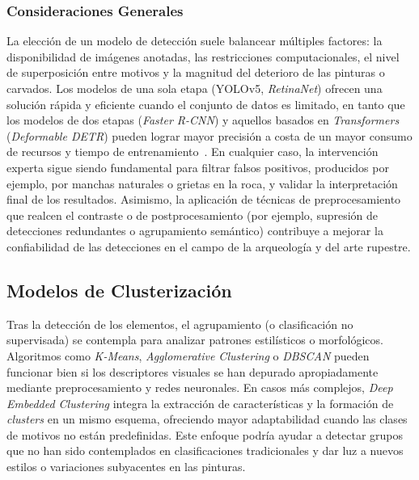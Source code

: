 \subsubsection*{Consideraciones Generales}

La elección de un modelo de detección suele balancear múltiples factores: la disponibilidad de imágenes anotadas, las restricciones computacionales, el nivel de superposición entre motivos y la magnitud del deterioro de las pinturas o carvados.
Los modelos de una sola etapa (YOLOv5, \textit{RetinaNet}) ofrecen una solución rápida y eficiente cuando el conjunto de datos es limitado, en tanto que los modelos de dos etapas (\textit{Faster R-CNN}) y aquellos basados en \textit{Transformers} (\textit{Deformable DETR}) pueden lograr mayor precisión a costa de un mayor consumo de recursos y tiempo de entrenamiento~\cite{horn2022,davis2021,jalandoni2022,li2022,tsigkas2020}.
En cualquier caso, la intervención experta sigue siendo fundamental para filtrar falsos positivos, producidos por ejemplo, por manchas naturales o grietas en la roca, y validar la interpretación final de los resultados.
Asimismo, la aplicación de técnicas de preprocesamiento que realcen el contraste o de postprocesamiento (por ejemplo, supresión de detecciones redundantes o agrupamiento semántico) contribuye a mejorar la confiabilidad de las detecciones en el campo de la arqueología y del arte rupestre.

\subsection{Modelos de Clusterización}

Tras la detección de los elementos, el agrupamiento (o clasificación no supervisada) se contempla para analizar patrones estilísticos o morfológicos.
Algoritmos como \textit{K-Means}, \textit{Agglomerative Clustering} o \textit{DBSCAN} pueden funcionar bien si los descriptores visuales se han depurado apropiadamente mediante preprocesamiento y redes neuronales.
En casos más complejos, \textit{Deep Embedded Clustering} integra la extracción de características y la formación de \textit{clusters} en un mismo esquema, ofreciendo mayor adaptabilidad cuando las clases de motivos no están predefinidas.
Este enfoque podría ayudar a detectar grupos que no han sido contemplados en clasificaciones tradicionales y dar luz a nuevos estilos o variaciones subyacentes en las pinturas.

